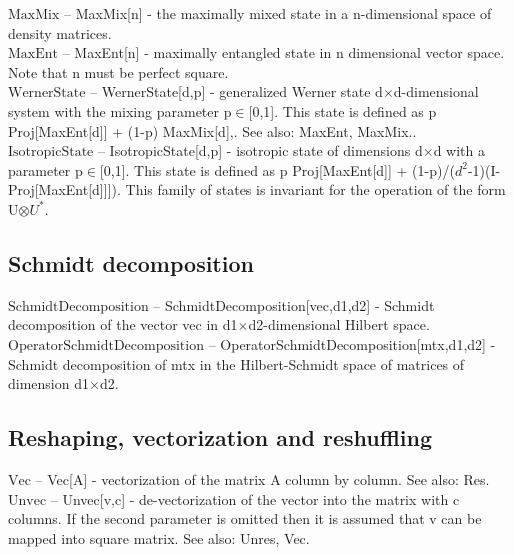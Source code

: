 \noindent\textbf{$ \text{MaxMix} $ }-- MaxMix[n] - the maximally mixed state in a n-dimensional space of density matrices.$  $\\[6pt]

\noindent\textbf{$ \text{MaxEnt} $ }-- MaxEnt[n] - maximally entangled state in n dimensional vector space. Note that n must be perfect square.$  $\\[6pt]

\noindent\textbf{$ \text{WernerState} $ }-- WernerState[d,p] - generalized Werner state d$\times $d-dimensional system with the mixing parameter p$\in $[0,1]. This state is defined as p Proj[MaxEnt[d]] + (1-p) MaxMix[d],. See also: MaxEnt, MaxMix..$  $\\[6pt]

\noindent\textbf{$ \text{IsotropicState} $ }-- IsotropicState[d,p] - isotropic state of dimensions d$\times $d with a parameter p$\in $[0,1]. This state is defined as p Proj[MaxEnt[d]] + (1-p)/($ d^2 $-1)(I-Proj[MaxEnt[d]]]). This family of states is invariant for the operation of the form U$\otimes $$ U^*. $\\[6pt]

\subsection{Schmidt decomposition}

\noindent\textbf{$ \text{SchmidtDecomposition} $ }-- SchmidtDecomposition[vec,d1,d2] - Schmidt decomposition of the vector vec in d1$\times $d2-dimensional Hilbert space.$  $\\[6pt]

\noindent\textbf{$ \text{OperatorSchmidtDecomposition} $ }-- OperatorSchmidtDecomposition[mtx,d1,d2] - Schmidt decomposition of mtx in the Hilbert-Schmidt space of matrices of dimension d1$\times $d2.$  $\\[6pt]

\subsection{Reshaping, vectorization and reshuffling}

\noindent\textbf{$ \text{Vec} $ }-- Vec[A] - vectorization of the matrix A column by column. See also: Res.$  $\\[6pt]

\noindent\textbf{$ \text{Unvec} $ }-- Unvec[v,c] - de-vectorization of the vector into the matrix with c columns. If the second parameter is omitted then it is assumed that v can be mapped into square matrix. See also: Unres, Vec.$  $\\[6pt]

